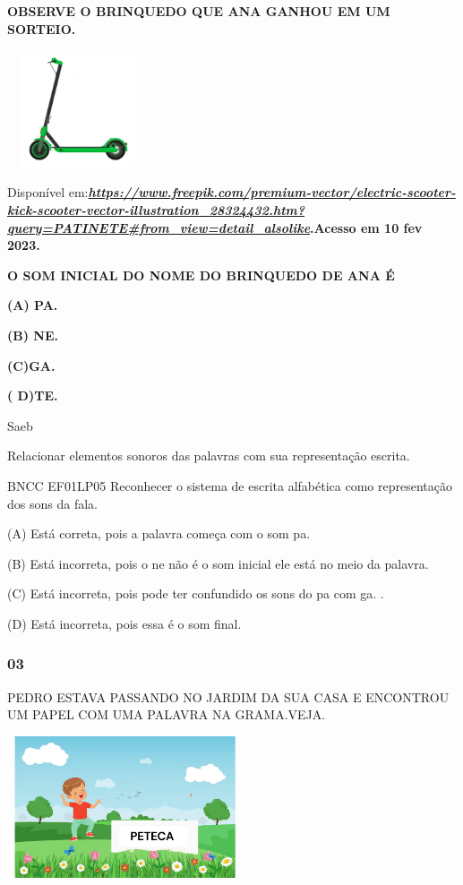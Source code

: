\textbf{OBSERVE O BRINQUEDO QUE ANA GANHOU EM UM SORTEIO.}

\includegraphics[width=1.65484in,height=1.36089in]{media/image83.png}

Disponível
em:\textbf{\href{https://www.freepik.com/premium-vector/electric-scooter-kick-scooter-vector-illustration_28324432.htm?query=PATINETE\#from_view=detail_alsolike}{\emph{https://www.freepik.com/premium-vector/electric-scooter-kick-scooter-vector-illustration\_28324432.htm?query=PATINETE\#from\_view=detail\_alsolike}}.Acesso
em 10 fev 2023.}

\textbf{O SOM INICIAL DO NOME DO BRINQUEDO DE ANA É}

\textbf{(A) PA.}

\textbf{(B) NE.}

\textbf{(C)GA.}

\textbf{( D)TE.}

Saeb

Relacionar elementos sonoros das palavras com sua representação escrita.

BNCC EF01LP05 Reconhecer o sistema de escrita alfabética como
representação dos sons da fala.

(A) Está correta, pois a palavra começa com o som pa.

(B) Está incorreta, pois o ne não é o som inicial ele está no meio da
palavra.

(C) Está incorreta, pois pode ter confundido os sons do pa com ga. .

(D) Está incorreta, pois essa é o som final.

\subsubsection{03}\label{section-2}

PEDRO ESTAVA PASSANDO NO JARDIM DA SUA CASA E ENCONTROU UM PAPEL COM UMA
PALAVRA NA GRAMA.VEJA.

\includegraphics[width=2.73976in,height=1.64660in]{media/image84.png}

